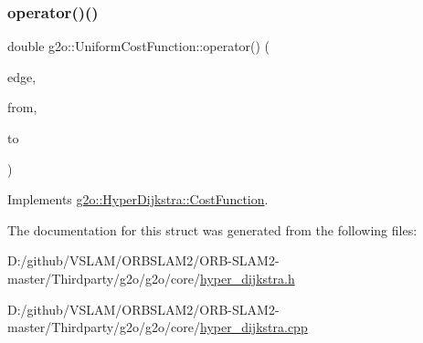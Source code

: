 \subsubsection{\texorpdfstring{operator()()}{operator()()}}
{\footnotesize\ttfamily double g2o\+::\+Uniform\+Cost\+Function\+::operator() (\begin{DoxyParamCaption}\item[{\mbox{\hyperlink{classg2o_1_1_hyper_graph_1_1_edge}{Hyper\+Graph\+::\+Edge}} $\ast$}]{edge,  }\item[{\mbox{\hyperlink{classg2o_1_1_hyper_graph_1_1_vertex}{Hyper\+Graph\+::\+Vertex}} $\ast$}]{from,  }\item[{\mbox{\hyperlink{classg2o_1_1_hyper_graph_1_1_vertex}{Hyper\+Graph\+::\+Vertex}} $\ast$}]{to }\end{DoxyParamCaption})\hspace{0.3cm}{\ttfamily [virtual]}}



Implements \mbox{\hyperlink{structg2o_1_1_hyper_dijkstra_1_1_cost_function_a6d30ca80400c75941851ae079cfd42fd}{g2o\+::\+Hyper\+Dijkstra\+::\+Cost\+Function}}.



The documentation for this struct was generated from the following files\+:\begin{DoxyCompactItemize}
\item 
D\+:/github/\+V\+S\+L\+A\+M/\+O\+R\+B\+S\+L\+A\+M2/\+O\+R\+B-\/\+S\+L\+A\+M2-\/master/\+Thirdparty/g2o/g2o/core/\mbox{\hyperlink{hyper__dijkstra_8h}{hyper\+\_\+dijkstra.\+h}}\item 
D\+:/github/\+V\+S\+L\+A\+M/\+O\+R\+B\+S\+L\+A\+M2/\+O\+R\+B-\/\+S\+L\+A\+M2-\/master/\+Thirdparty/g2o/g2o/core/\mbox{\hyperlink{hyper__dijkstra_8cpp}{hyper\+\_\+dijkstra.\+cpp}}\end{DoxyCompactItemize}
